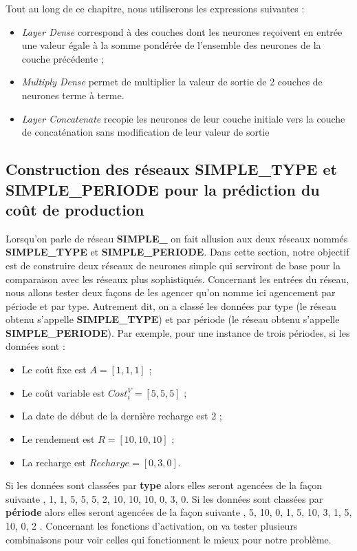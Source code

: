 Tout au long de ce chapitre, nous utiliserons les expressions suivantes :
\begin{itemize}[label=$\square$]
	\item \textit{Layer Dense} correspond à des couches dont les neurones reçoivent en entrée une valeur égale à la somme pondérée de l'ensemble des neurones de la couche précédente ;
	\item \textit{Multiply Dense} permet de multiplier la valeur de sortie de 2 couches de neurones terme à terme.
	\item \textit{Layer Concatenate} recopie les neurones de leur couche initiale vers la couche de concaténation sans modification de leur valeur de sortie
\end{itemize}
\subsection{Construction des réseaux \textbf{SIMPLE\_TYPE} et \textbf{SIMPLE\_PERIODE} pour la prédiction du coût de production} 
Lorsqu'on parle de réseau \textbf{SIMPLE\_} on fait allusion aux deux réseaux nommés \textbf{SIMPLE\_TYPE} et \textbf{SIMPLE\_PERIODE}. Dans cette section, notre objectif est de construire deux réseaux de neurones \og simple \fg{} qui serviront de base pour la comparaison avec les réseaux plus sophistiqués. Concernant les entrées du réseau, nous allons tester deux façons de les agencer qu'on nomme ici agencement par période et par type. Autrement dit, on a classé les données par type (le réseau obtenu s'appelle \textbf{SIMPLE\_TYPE}) et par période (le réseau obtenu s'appelle \textbf{SIMPLE\_PERIODE}). Par exemple, pour une instance de trois périodes, si les données sont : 
\begin{itemize}[label=$\square$]
\item Le coût fixe est $A=[1,1,1]$ ;
\item Le coût variable est $Cost_i^V=[5,5,5]$ ;
\item La date de début de la dernière recharge est 2 ;
\item Le rendement est $R= [10, 10, 10]$ ;
\item La recharge est $Recharge=[0,3,0]$.
\end{itemize}
 Si les données sont classées par \textbf{type} alors elles seront agencées de la façon suivante , 1, 1, 5, 5, 5, 2, 10, 10, 10, 0, 3, 0\fg{}. Si les données sont classées par \textbf{période} alors elles seront agencées de la façon suivante , 5, 10, 0, 1, 5, 10, 3, 1, 5, 10, 0, 2 \fg{}. Concernant les fonctions d'activation, on va tester plusieurs combinaisons pour voir celles qui fonctionnent le mieux pour notre problème.

